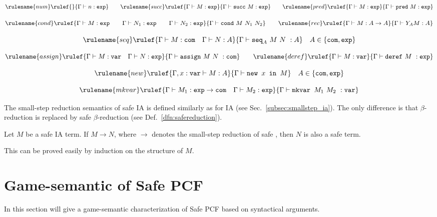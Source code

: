 $$ \rulename{num} \rulef{}{\Gamma \vdash n :\texttt{exp}}
\qquad \rulename{succ} \rulef{\Gamma \vdash M:\texttt{exp} }{\Gamma
\vdash \texttt{succ}\ M:\texttt{exp}} \qquad \rulename{pred}
\rulef{\Gamma \vdash M:\texttt{exp} }{\Gamma \vdash \texttt{pred}\
M:\texttt{exp}}$$

$$
\rulename{cond} \rulef{\Gamma \vdash M : \texttt{exp} \qquad \Gamma
\vdash N_1 : \texttt{exp} \qquad \Gamma \vdash N_2 : \texttt{exp}
}{\Gamma \vdash \texttt{cond}\ M\ N_1\ N_2} \qquad  \rulename{rec}
\rulef{\Gamma \vdash M : A\rightarrow A }{ \Gamma \vdash Y_A M :
A}$$

$$ \rulename{seq} \rulef{\Gamma \vdash M : \texttt{com} \quad \Gamma \vdash N :A}
    {\Gamma \vdash \texttt{seq}_A \ M\ N\ : A} \quad A \in \{ \texttt{com}, \texttt{exp}\}$$

$$ \rulename{assign} \rulef{\Gamma \vdash M : \texttt{var} \quad \Gamma \vdash N : \texttt{exp}}
    {\Gamma \vdash \texttt{assign}\ M\ N\ : \texttt{com}}
\qquad
 \rulename{deref} \rulef{\Gamma \vdash M : \texttt{var}}
    {\Gamma \vdash \texttt{deref}\ M\ : \texttt{exp}}$$

$$ \rulename{new} \rulef{\Gamma, x : \texttt{var} \vdash M : A}
    {\Gamma \vdash \texttt{new } x \texttt{ in } M} \quad A \in \{ \texttt{com}, \texttt{exp}\}$$

$$ \rulename{mkvar} \rulef{\Gamma \vdash M_1 : \texttt{exp} \rightarrow \texttt{com} \quad \Gamma \vdash M_2 : \texttt{exp}}
    {\Gamma \vdash \texttt{mkvar } M_1\ M_2\ : \texttt{var}}$$


The small-step reduction semantics of safe IA is defined similarly as for IA (see Sec.\ \ref{subsec:smallstep_ia}). The only difference is that $\beta$-reduction is replaced by safe $\beta$-reduction (see Def.\ \ref{dfn:safereduction}).

\begin{lemma}
\label{lem:ia_safety_preserved} Let $M$ be a safe IA term. If
$M \rightarrow N$, where $\rightarrow$ denotes the small-step reduction of safe \ialgol, then $N$ is also a safe term.
\end{lemma}
This can be proved easily by induction on the structure of $M$.



\section{Game-semantic of Safe PCF}
In this section will give a game-semantic characterization of Safe
PCF based on syntactical arguments.


